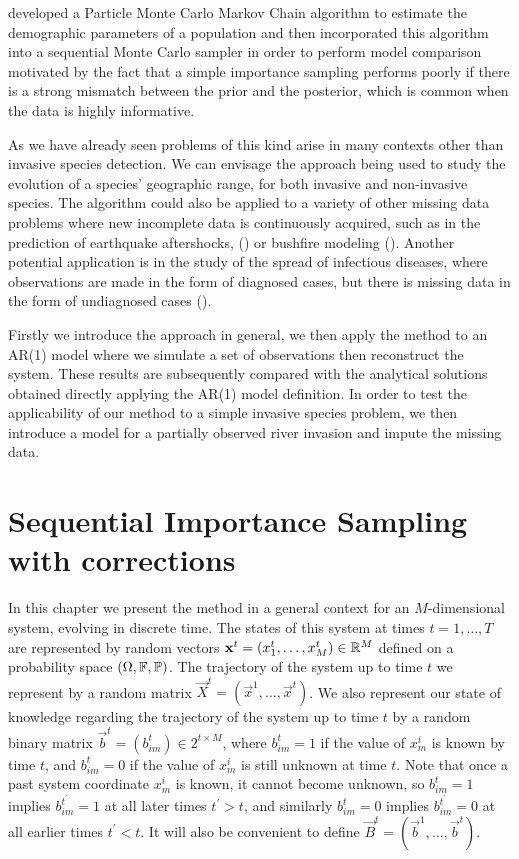 \cite{Finke} developed a Particle Monte Carlo Markov Chain algorithm to estimate the demographic parameters of a population and then incorporated this algorithm into a sequential Monte Carlo sampler in order to perform model comparison motivated by the fact that a simple importance sampling performs poorly if there is a strong mismatch between the prior and the posterior, which is common when the data is highly informative.

As we have already seen problems of this kind arise in many contexts other than invasive species detection. We can envisage the approach being used to study the evolution of a species' geographic range, for both invasive and non-invasive species. The algorithm could also be applied to a variety of other missing data problems where new incomplete data is continuously acquired, such as in the prediction of earthquake aftershocks, (\cite{Seif}) or bushfire modeling (\cite{Beer}). Another potential application is in the study of the spread of infectious diseases, where observations are made in the form of diagnosed cases, but there is missing data in the form of undiagnosed cases (\cite{O'Neill}).

Firstly we introduce the approach in general, we then apply the method to an AR(1) model where we simulate a set of observations then reconstruct the system. These results are subsequently compared with the analytical solutions obtained directly applying the AR(1) model definition. In order to test the applicability of our method to a simple invasive species problem, we then introduce a model for a partially observed river invasion and impute the missing data.





\section{Sequential Importance Sampling with corrections}
\label{sec:2}

In this chapter we present the method in a general context for an $M$-dimensional system, evolving in discrete time. The states of this system at times $t = 1, \dots, T$ are represented by random vectors $\mathbf{x}^t = (x^t_1, \dots, x^t_M) \in \mathbb R^M$ defined on a probability space $(\Omega, \mathbb{F}, \mathbb{P})$. The trajectory of the system up to time $t$ we represent by a random matrix $\vec{X}^t = (\vec{x}^1, \ldots, \vec{x}^t)$. We also represent our state of knowledge regarding the trajectory of the system up to time $t$ by a random binary matrix $\vec{b}^t = (b^t_{im}) \in 2^{t \times M}$, where $b^t_{im} = 1$ if the value of $x^i_m$ is known by time $t$, and $b^t_{im} = 0$ if the value of $x^i_m$ is still unknown at time $t$. Note that once a past system coordinate $x^i_m$ is known, it cannot become unknown, so $b^t_{im} = 1$ implies $b^{t^\prime}_{im} = 1$ at all later times $t^{\prime} > t$, and similarly $b^t_{im} = 0$ implies $b^{t^{\prime}}_{im} = 0$ at all earlier times $t^{\prime} < t$. It will also be convenient to define $\vec{B}^t = (\vec{b}^1,\ldots,\vec{b}^t)$.

